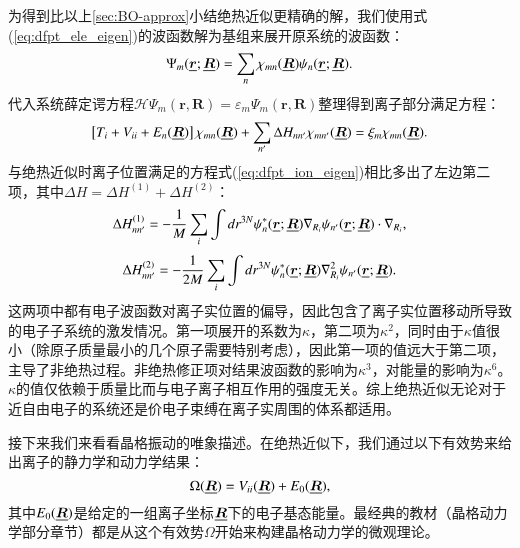 为得到比以上\ref{sec:BO-approx}小结绝热近似更精确的解，我们使用式(\ref{eq:dfpt_ele_eigen})的波函数解为基组来展开原系统的波函数：
\begin{equation}
  \Psi_m(\underline{\bm{r}};\underline{\bm{R}}) = \sum_n \chi_{mn}(\underline{\bm{R}})\psi_n(\underline{\bm{r}};\underline{\bm{R}}).
\end{equation}
代入系统薛定谔方程$\mathcal{H} \Psi_m(\bm{r},\bm{R})=\mathcal{\varepsilon}_m \Psi_m(\bm{r},\bm{R})$整理得到离子部分满足方程：
\begin{equation}
  \left[ T_i + V_{ii} + E_n(\underline{\bm{R}}) \right] \chi_{mn}(\underline{\bm{R}}) + \sum_{n'}\Delta H_{nn'}\chi_{mn'}(\underline{\bm{R}}) = \xi_m \chi_{mn} (\underline{\bm{R}}).
\end{equation}
与绝热近似时离子位置满足的方程式(\ref{eq:dfpt_ion_eigen})相比多出了左边第二项，其中$\Delta H=\Delta H^{(1)} + \Delta H^{(2)}$：
\begin{equation}
  \Delta H_{nn'}^{(1)} = -\frac{1}{M}\sum_i \int dr^{3N}\psi_n^*(\underline{\bm{r}};\underline{\bm{R}})\nabla_{R_i}\psi_{n'}(\underline{\bm{r}};\underline{\bm{R}})\cdot \nabla_{R_i},
\end{equation}
\begin{equation}
  \Delta H_{nn'}^{(2)} = -\frac{1}{2M}\sum_i \int dr^{3N}\psi_n^*(\underline{\bm{r}};\underline{\bm{R}})\nabla^2_{R_i}\psi_{n'}(\underline{\bm{r}};\underline{\bm{R}}).
\end{equation}
这两项中都有电子波函数对离子实位置的偏导，因此包含了离子实位置移动所导致的电子子系统的激发情况。第一项展开的系数为$\kappa$，第二项为$\kappa^2$，同时由于$\kappa$值很小（除原子质量最小的几个原子需要特别考虑），因此第一项的值远大于第二项，主导了非绝热过程。非绝热修正项对结果波函数的影响为$\kappa^3$，对能量的影响为$\kappa^6$。$\kappa$的值仅依赖于质量比而与电子离子相互作用的强度无关。综上绝热近似无论对于近自由电子的系统还是价电子束缚在离子实周围的体系都适用。

接下来我们来看看晶格振动的唯象描述。在绝热近似下，我们通过以下有效势来给出离子的静力学和动力学结果：
\begin{equation}\label{eq:effective_potential}
  \Omega(\underline{\bm{R}}) = V_{ii}(\underline{\bm{R}}) + E_0(\underline{\bm{R}}),
\end{equation}
其中$E_0(\underline{\bm{R}})$是给定的一组离子坐标$\underline{\bm{R}}$下的电子基态能量。最经典的教材\cite{born1954dynamical,bottger1983principles}（晶格动力学部分章节）都是从这个有效势$\Omega$开始来构建晶格动力学的微观理论。

